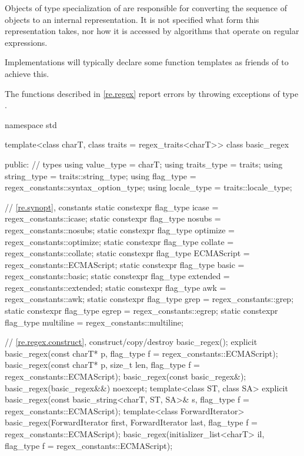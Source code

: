 \pnum
Objects of type specialization of  are responsible for
converting the sequence of  objects to an internal
representation. It is not specified what form this representation
takes, nor how it is accessed by algorithms that operate on regular
expressions.
\begin{note}
Implementations will typically declare
some function templates as friends of  to achieve
this.
\end{note}

\pnum
{}%
The functions described in \ref{re.regex} report errors by throwing
exceptions of type .

%
\begin{codeblock}
namespace std {
  template<class charT, class traits = regex_traits<charT>>
  class basic_regex {
  public:
    // types
    using value_type  = charT;
    using traits_type = traits;
    using string_type = traits::string_type;
    using flag_type   = regex_constants::syntax_option_type;
    using locale_type = traits::locale_type;

    // \ref{re.synopt}, constants
    static constexpr flag_type icase = regex_constants::icase;
    static constexpr flag_type nosubs = regex_constants::nosubs;
    static constexpr flag_type optimize = regex_constants::optimize;
    static constexpr flag_type collate = regex_constants::collate;
    static constexpr flag_type ECMAScript = regex_constants::ECMAScript;
    static constexpr flag_type basic = regex_constants::basic;
    static constexpr flag_type extended = regex_constants::extended;
    static constexpr flag_type awk = regex_constants::awk;
    static constexpr flag_type grep = regex_constants::grep;
    static constexpr flag_type egrep = regex_constants::egrep;
    static constexpr flag_type multiline = regex_constants::multiline;

    // \ref{re.regex.construct}, construct/copy/destroy
    basic_regex();
    explicit basic_regex(const charT* p, flag_type f = regex_constants::ECMAScript);
    basic_regex(const charT* p, size_t len, flag_type f = regex_constants::ECMAScript);
    basic_regex(const basic_regex&);
    basic_regex(basic_regex&&) noexcept;
    template<class ST, class SA>
      explicit basic_regex(const basic_string<charT, ST, SA>& s,
                           flag_type f = regex_constants::ECMAScript);
    template<class ForwardIterator>
      basic_regex(ForwardIterator first, ForwardIterator last,
                  flag_type f = regex_constants::ECMAScript);
    basic_regex(initializer_list<charT> il, flag_type f = regex_constants::ECMAScript);

}}
\end{codeblock}
